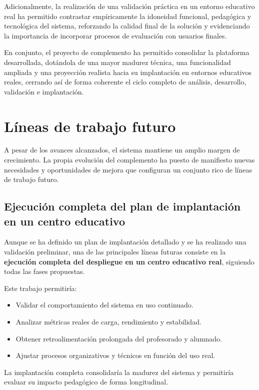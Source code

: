 Adicionalmente, la realización de una validación práctica en un entorno educativo real ha permitido contrastar empíricamente la idoneidad funcional, pedagógica y tecnológica del sistema, reforzando la calidad final de la solución y evidenciando la importancia de incorporar procesos de evaluación con usuarios finales.

En conjunto, el proyecto de complemento ha permitido consolidar la plataforma desarrollada, dotándola de una mayor madurez técnica, una funcionalidad ampliada y una proyección realista hacia su implantación en entornos educativos reales, cerrando así de forma coherente el ciclo completo de análisis, desarrollo, validación e implantación.

\section{Líneas de trabajo futuro}

A pesar de los avances alcanzados, el sistema mantiene un amplio margen de crecimiento. La propia evolución del complemento ha puesto de manifiesto nuevas necesidades y oportunidades de mejora que configuran un conjunto rico de líneas de trabajo futuro.

\subsection{Ejecución completa del plan de implantación en un centro educativo}

Aunque se ha definido un plan de implantación detallado y se ha realizado una validación preliminar, una de las principales líneas futuras consiste en la \textbf{ejecución completa del despliegue en un centro educativo real}, siguiendo todas las fases propuestas.

Este trabajo permitiría:
\begin{itemize}
    \item Validar el comportamiento del sistema en uso continuado.
    \item Analizar métricas reales de carga, rendimiento y estabilidad.
    \item Obtener retroalimentación prolongada del profesorado y alumnado.
    \item Ajustar procesos organizativos y técnicos en función del uso real.
\end{itemize}

La implantación completa consolidaría la madurez del sistema y permitiría evaluar su impacto pedagógico de forma longitudinal.
\newpage
